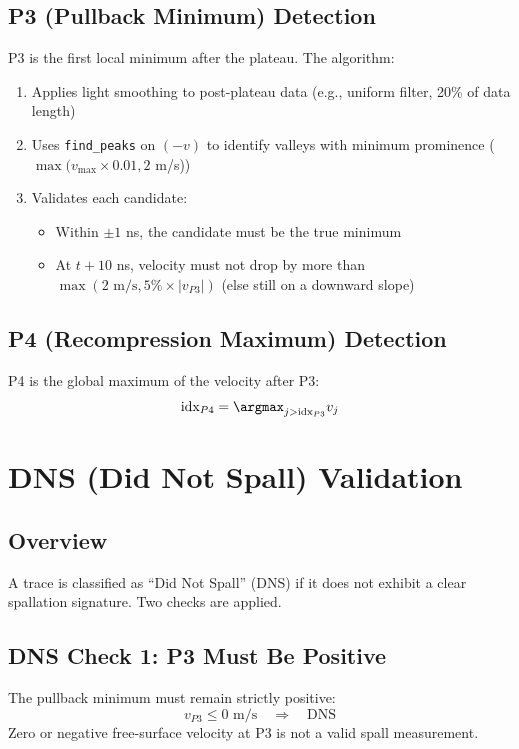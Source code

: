 \subsection{P3 (Pullback Minimum) Detection}
P3 is the first local minimum after the plateau. The algorithm:
\begin{enumerate}
    \item Applies light smoothing to post-plateau data (e.g., uniform filter, 20\% of data length)
    \item Uses \texttt{find\_peaks} on $(-v)$ to identify valleys with minimum prominence ($\max(v_{\max} \times 0.01, 2$ m/s))
    \item Validates each candidate:
    \begin{itemize}
        \item Within $\pm 1$ ns, the candidate must be the true minimum
        \item At $t + 10$ ns, velocity must not drop by more than $\max(2 \text{ m/s}, 5\% \times |v_{P3}|)$ (else still on a downward slope)
    \end{itemize}
\end{enumerate}

\subsection{P4 (Recompression Maximum) Detection}
P4 is the global maximum of the velocity after P3:
\begin{equation}
\text{idx}_{P4} = \argmax_{j > \text{idx}_{P3}} v_j
\end{equation}

\section{DNS (Did Not Spall) Validation}

\subsection{Overview}
A trace is classified as ``Did Not Spall'' (DNS) if it does not exhibit a clear spallation signature. Two checks are applied.

\subsection{DNS Check 1: P3 Must Be Positive}
The pullback minimum must remain strictly positive:
\begin{equation}
v_{P3} \leq 0 \text{ m/s} \quad \Rightarrow \quad \text{DNS}
\end{equation}
Zero or negative free-surface velocity at P3 is not a valid spall measurement.

